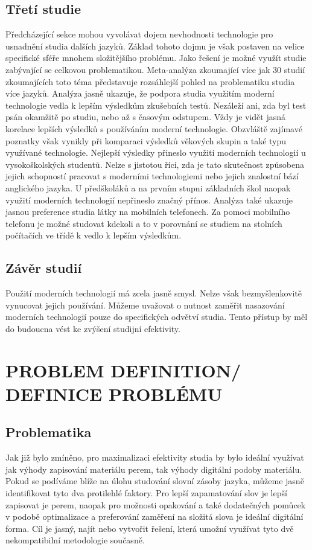 \documentclass[journal]{IEEEtran}
\begin{document}
\subsection{Třetí studie}
Předcházející sekce mohou vyvolávat dojem nevhodnosti technologie pro usnadnění studia dalších jazyků.
Základ tohoto dojmu je však postaven na velice specifické sféře mnohem složitějšího problému.
Jako řešení je možné využít studie zabývající se celkovou problematikou.
Meta-analýza zkoumající více jak 30 studií zkoumajících toto téma představuje rozsáhlejší pohled na problematiku studia více jazyků.\cite{technology_vocab} Analýza jasně ukazuje, že podpora studia využitím moderní technologie vedla k lepším výsledkům zkušebních testů.
Nezáleží ani, zda byl test psán okamžitě po studiu, nebo až s časovým odstupem.
Vždy je vidět jasná korelace lepších výsledků s používáním moderní technologie.
Obzvláště zajímavé poznatky však vynikly při komparaci výsledků věkových skupin a také typu využívané technologie.
Nejlepší výsledky přineslo využití moderních technologií u vysokoškolských studentů.
Nelze s jistotou říci, zda je tato skutečnost způsobena jejich schopností pracovat s moderními technologiemi nebo jejich znalostní bází anglického jazyka.
U předškoláků a na prvním stupni základních škol naopak využití moderních technologií nepřineslo značný přínos.
Analýza také ukazuje jasnou preference studia látky na mobilních telefonech.
Za pomoci mobilního telefonu je možné studovat kdekoli a to v porovnání se studiem na stolních počítačích ve třídě k vedlo k lepším výsledkům.

\subsection{Závěr studií}
Použití moderních technologií má zcela jasně smysl.
Nelze však bezmyšlenkovitě vynucovat jejich používání.
Můžeme uvažovat o nutnost zaměřit nasazování moderních technologií pouze do specifických odvětví studia.
Tento přístup by měl do budoucna vést ke zvýšení studijní efektivity.

\section{PROBLEM DEFINITION/ DEFINICE PROBLÉMU}

\subsection{Problematika}
Jak již bylo zmíněno, pro maximalizaci efektivity studia by bylo ideální využívat jak výhody zapisování materiálu perem, tak výhody digitální podoby materiálu. Pokud se podíváme blíže na úlohu studování slovní zásoby jazyka, můžeme jasně identifikovat tyto dva protilehlé faktory. Pro lepší zapamatování slov je lepší zapisovat je perem, naopak pro možnosti opakování a také dodatečných pomůcek v podobě optimalizace a preferování zaměření na složitá slova je ideální digitální forma. Cíl je jasný, najít nebo vytvořit řešení, která umožní využívat tyto dvě nekompatibilní metodologie současně.
\end{document}
